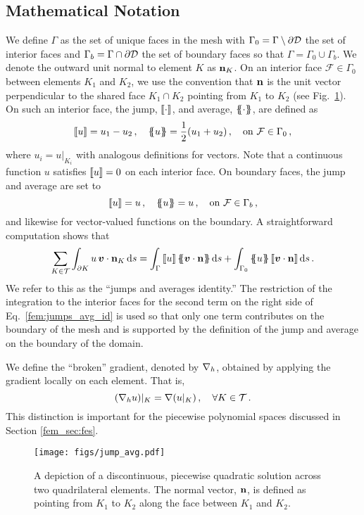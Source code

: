 \documentclass[../doc.tex]{subfiles}
\begin{document}
\subsection{Mathematical Notation}
We define $\Gamma$ as the set of unique faces in the mesh with $\Gamma_0 = \Gamma\setminus \partial\mathcal{D}$ the set of interior faces and $\Gamma_b = \Gamma \cap \partial\mathcal{D}$ the set of boundary faces so that $\Gamma = \Gamma_0 \cup \Gamma_b$. We denote the outward unit normal to element $K$ as $\boldsymbol{\mathrm{n}}_K$. On an interior face $\mathcal{F} \in \Gamma_0$ between elements $K_1$ and $K_2$, we use the convention that $\boldsymbol{\mathrm{n}}$ is the unit vector perpendicular to the shared face $K_1 \cap K_2$ pointing from $K_1$ to $K_2$ (see Fig.~\ref{fem:jump_avg_diag}). On such an interior face, the jump, $\left\llbracket\cdot \right\rrbracket$, and average, $\left\{\!\!\left\{\cdot\right\}\!\!\right\}$, are defined as 
	\begin{equation} \label{fem:jump_avg}
		\left\llbracket u \right\rrbracket = u_1 - u_2 \,, \quad \left\{\!\!\left\{u\right\}\!\!\right\} = \frac{1}{2}(u_1 + u_2) \,, \quad \mathrm{on} \ \mathcal{F} \in \Gamma_0 \,, 
	\end{equation}
where $u_i = u|_{K_i}$ with analogous definitions for vectors. Note that a continuous function $u$ satisfies $\left\llbracket u \right\rrbracket = 0$ on each interior face. 
On boundary faces, the jump and average are set to 
	\begin{equation} \label{fem:jump_avg_bdr}
		\jump{u} = u \,, \quad \avg{u} = u \,, \quad \mathrm{on} \ \mathcal{F} \in \Gamma_b \,,
	\end{equation}
and likewise for vector-valued functions on the boundary. A straightforward computation shows that 
	\begin{equation} \label{fem:jumps_avg_id}
		\sum_{K\in\meshT} \int_{\partial K} u\, \vec{v}\cdot\n_K \ud s = \int_\Gamma \jump{u} \avg{\vec{v}\cdot\n} \ud s + \int_{\Gamma_0} \avg{u}\jump{\vec{v}\cdot\n} \ud s \,. 
	\end{equation}
We refer to this as the ``jumps and averages identity.'' The restriction of the integration to the interior faces for the second term on the right side of Eq.~\ref{fem:jumps_avg_id} is used so that only one term contributes on the boundary of the mesh and is supported by the definition of the jump and average on the boundary of the domain. 

We define the ``broken'' gradient, denoted by $\nabla_h$, obtained by applying the gradient locally on each element. That is, 
	\begin{equation} \label{fem:broken_grad}
		(\nabla_h u)|_{K} = \nabla(u|_K) \,, \quad \forall K \in \mathcal{T} \,. 
	\end{equation}
This distinction is important for the piecewise polynomial spaces discussed in Section \ref{fem_sec:fes}. 
\begin{figure}
\centering
\texttt{[image: figs/jump\_avg.pdf]}
\caption{A depiction of a discontinuous, piecewise quadratic solution across two quadrilateral elements. The normal vector, $\boldsymbol{\mathrm{n}}$, is defined as pointing from $K_1$ to $K_2$ along the face between $K_1$ and $K_2$.}
\label{fem:jump_avg_diag}
\end{figure}
\end{document}
